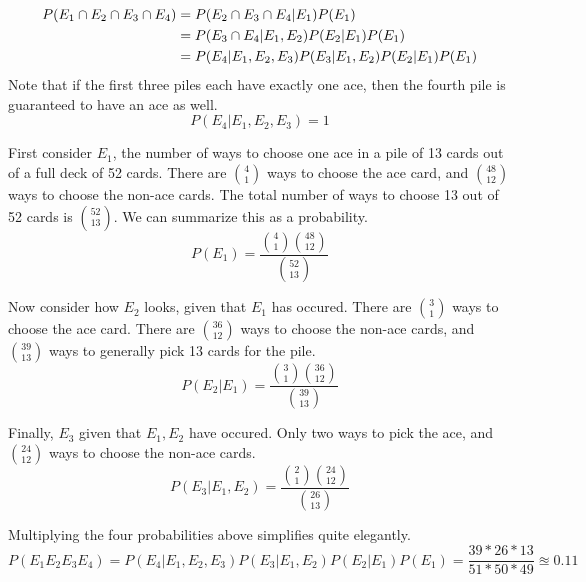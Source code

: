 \documentclass{article}
\begin{document}
    \begin{solution}
        \begin{align*}
            P(E_1 \cap E_2 \cap E_3 \cap E_4) &= P(E_2 \cap E_3 \cap E_4 | E_1) P(E_1) \\
            &= P(E_3 \cap E_4 | E_1, E_2) P(E_2 | E_1) P(E_1) \\
            &= P(E_4 | E_1, E_2, E_3) P(E_3 | E_1, E_2) P(E_2 | E_1) P(E_1)
        \end{align*}
        Note that if the first three piles each have exactly one ace, then the fourth pile is guaranteed to have an ace as well.
        \begin{equation*}
            P(E_4 | E_1, E_2, E_3) = 1
        \end{equation*}

        First consider $E_1$, the number of ways to choose one ace in a pile of 13 cards out of a full deck of 52 cards. There are $\binom{4}{1}$ ways to choose the ace card, and $\binom{48}{12}$ ways to choose the non-ace cards. The total number of ways to choose 13 out of 52 cards is $\binom{52}{13}$. We can summarize this as a probability.
        \begin{equation*}
            P(E_1) = \frac{\binom{4}{1}\binom{48}{12} } { \binom{52}{13} }
        \end{equation*}

        Now consider how $E_2$ looks, given that $E_1$ has occured. There are $\binom{3}{1}$ ways to choose the ace card. There are $\binom{36}{12}$ ways to choose the non-ace cards, and $\binom{39}{13}$ ways to generally pick 13 cards for the pile.
        \begin{equation*}
            P(E_2 | E_1) =  \frac{\binom{3}{1} \binom{36}{12}} {\binom{39}{13}}
        \end{equation*}

        Finally, $E_3$ given that $E_1, E_2$ have occured. Only two ways to pick the ace, and $\binom{24}{12}$ ways to choose the non-ace cards.
        \begin{equation*}
            P(E_3 | E_1, E_2) = \frac{\binom{2}{1} \binom{24}{12}} {\binom{26}{13}}
        \end{equation*}

        Multiplying the four probabilities above simplifies quite elegantly.
        \begin{equation}
            P(E_1 E_2 E_3 E_4) = P(E_4 | E_1, E_2, E_3) P(E_3 | E_1, E_2) P(E_2 | E_1) P(E_1) = \frac{39*26*13}{51*50*49} \approxeq 0.11
        \end{equation}
    \end{solution}
\end{document}
